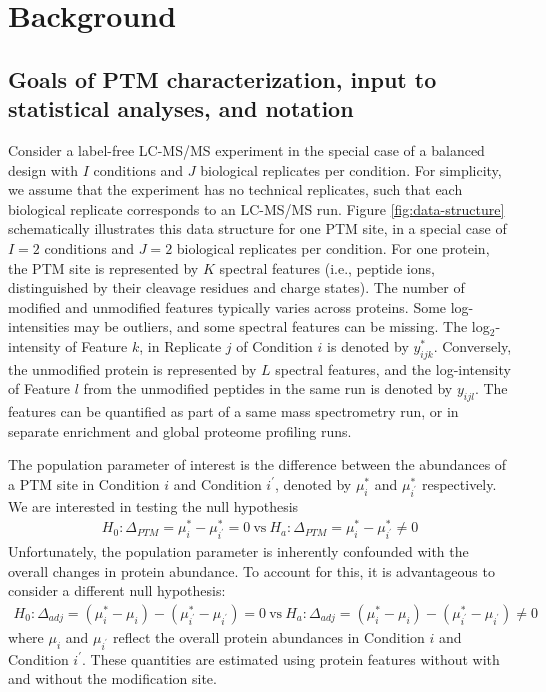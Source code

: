 \documentclass[mcp]{article}
\numberwithin{table}{section}
\begin{document}
\section*{Background}

\subsection*{Goals of PTM characterization, input to statistical analyses, and notation}

Consider a label-free LC-MS/MS experiment in the special case of a balanced design with $I$ conditions and $J$ biological replicates per condition. For simplicity, we assume that the experiment has no technical replicates, such that each biological replicate corresponds to an LC-MS/MS run.  
Figure \ref{fig:data-structure} schematically illustrates this data structure for one PTM site, in a special case of $I=2$ conditions and $J=2$ biological replicates per condition.
For one protein, the PTM site is represented by $K$ spectral features (i.e., peptide ions, distinguished by their cleavage residues and charge states). 
The number of modified and unmodified features typically varies across proteins. Some log-intensities may be outliers, and some spectral features can be missing. 
The log$_2$-intensity of Feature $k$, in Replicate $j$ of Condition $i$ is denoted by $y_{ijk}^{\ast}$. Conversely, the unmodified protein is represented by $L$ spectral features, and the log-intensity of Feature $l$ from the unmodified peptides in the same run is denoted by $y_{ijl}$. The features can be quantified as part of a same mass spectrometry run, or in separate enrichment and global proteome profiling runs.

The population parameter of interest is the difference between the abundances of a PTM site in Condition $i$ and Condition $i^{\prime}$, denoted by $\mu_i^{\ast}$ and $\mu_{i^{\prime}}^{\ast}$ respectively. We are interested in testing the null hypothesis
\begin{eqnarray}
H_{0}: \Delta_{PTM} = \mu_{i}^{\ast} - \mu_{i^{\prime}}^{\ast} = 0 \ \text{vs} \ 
H_{a}: \Delta_{PTM} = \mu_{i}^{\ast} - \mu_{i^{\prime}}^{\ast} \neq 0
\label{eq:conv_null_hyp}
\end{eqnarray}
Unfortunately, the population parameter is inherently confounded with the overall changes in protein abundance. To account for this, it is advantageous to consider a different null hypothesis:
\begin{eqnarray}
H_{0}: \Delta_{adj} = ( \mu_{i}^{\ast} - \mu_{i}) - ( \mu_{i^{\prime}}^{\ast} - \mu_{i^{\prime}} ) = 0 \ \text{vs} \ 
H_{a}: \Delta_{adj} = ( \mu_{i}^{\ast} - \mu_{i}) - ( \mu_{i^{\prime}}^{\ast} - \mu_{i^{\prime}} ) \neq 0
\label{eq:null_hyp}
\end{eqnarray}
where $\mu_i$ and $\mu_{i^{\prime}}$ reflect the overall protein abundances in Condition $i$ and Condition $i^{\prime}$. These quantities are estimated using protein features without with and without the modification site.
\end{document}
